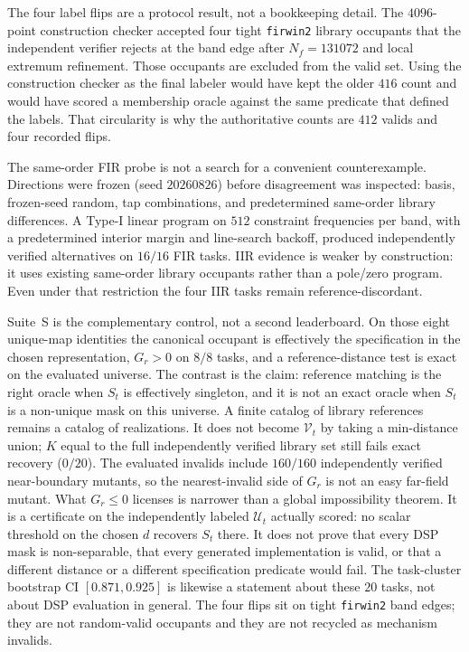 \documentclass{article}
\begin{document}
The four label flips are a protocol result, not a bookkeeping
detail.
The $4096$-point construction checker accepted four tight
\texttt{firwin2} library occupants that the independent verifier
rejects at the band edge after $N_f=131072$ and local extremum
refinement.
Those occupants are excluded from the valid set.
Using the construction checker as the final labeler would have
kept the older $416$ count and would have scored a membership
oracle against the same predicate that defined the labels.
That circularity is why the authoritative counts are $412$ valids
and four recorded flips.

The same-order FIR probe is not a search for a convenient
counterexample.
Directions were frozen (seed $20260826$) before disagreement was
inspected: basis, frozen-seed random, tap combinations, and
predetermined same-order library differences.
A Type-I linear program on $512$ constraint frequencies per band,
with a predetermined interior margin and line-search backoff,
produced independently verified alternatives on $16/16$ FIR
tasks.
IIR evidence is weaker by construction: it uses existing
same-order library occupants rather than a pole/zero program.
Even under that restriction the four IIR tasks remain
reference-discordant.

Suite~S is the complementary control, not a second leaderboard.
On those eight unique-map identities the canonical occupant is
effectively the specification in the chosen representation,
$G_r>0$ on $8/8$ tasks, and a reference-distance test is exact on
the evaluated universe.
The contrast is the claim: reference matching is the right oracle
when $S_t$ is effectively singleton, and it is not an exact
oracle when $S_t$ is a non-unique mask on this universe.
A finite catalog of library references remains a catalog of
realizations.
It does not become $\mathcal{V}_t$ by taking a min-distance
union; $K$ equal to the full independently verified library set
still fails exact recovery ($0/20$).
The evaluated invalids include $160/160$ independently verified
near-boundary mutants, so the nearest-invalid side of $G_r$ is
not an easy far-field mutant.
What $G_r\le 0$ licenses is narrower than a global impossibility
theorem.
It is a certificate on the independently labeled
$\mathcal{U}_t$ actually scored: no scalar threshold on the
chosen $d$ recovers $S_t$ there.
It does not prove that every DSP mask is non-separable, that
every generated implementation is valid, or that a different
distance or a different specification predicate would fail.
The task-cluster bootstrap CI $[0.871,0.925]$ is likewise a
statement about these $20$ tasks, not about DSP evaluation in
general.
The four flips sit on tight \texttt{firwin2} band edges; they
are not random-valid occupants and they are not recycled as
mechanism invalids.
\end{document}
